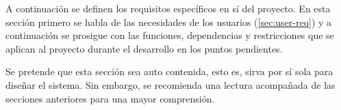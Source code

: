 A continuación se definen los requisitos específicos en sí del proyecto. En esta
sección primero se habla de las necesidades de los usuarios (\ref{sec:user-req})
y a continuación se prosigue con las funciones, dependencias y restricciones
que se aplican al proyecto durante el desarrollo en los puntos pendientes.

Se pretende que esta sección sea auto contenida, esto es, sirva por sí sola para
diseñar el sistema. Sin embargo, se recomienda una lectura acompañada de las
secciones anteriores para una mayor comprensión.